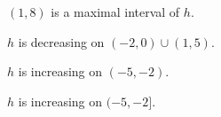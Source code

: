 \documentclass{ximera}
\begin{document}
\begin{exercise}
\begin{question}
\begin{multipleChoice}
\end{multipleChoice}

\end{question}





\begin{question}
$(1,8)$ is a maximal interval of $h$.

\begin{multipleChoice}
\end{multipleChoice}

\end{question}








\begin{question}
$h$ is decreasing on $(-2,0) \cup (1,5)$.

\begin{multipleChoice}
\end{multipleChoice}

\end{question}







\begin{question}
$h$ is increasing on $(-5,-2)$.

\begin{multipleChoice}
\end{multipleChoice}

\end{question}






\begin{question}
$h$ is increasing on $(-5,-2]$.

\begin{multipleChoice}
\end{multipleChoice}

\end{question}










\end{exercise}
\end{document}
